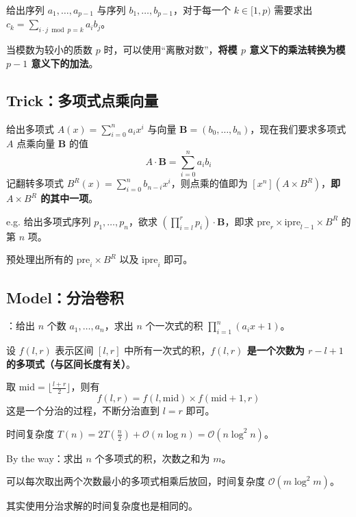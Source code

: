 给出序列 $a_1, \dots, a_{p - 1}$ 与序列 $b_1, \dots, b_{p - 1}$，对于每一个 $k \in [1, p)$ 需要求出 $c_k = \sum_{i\cdot j \bmod p = k} a_ib_j$。

当模数为较小的质数 $p$ 时，可以使用“离散对数”，\textbf{将模 $p$ 意义下的乘法转换为模 $p - 1$ 意义下的加法}。

\subsection{Trick：多项式点乘向量}

给出多项式 $A(x) = \sum_{i = 0}^n a_ix^i$ 与向量 $\mathbf{B} = (b_0, \dots, b_n)$，现在我们要求多项式 $A$ 点乘向量 $\mathbf{B}$ 的值
\[
A \cdot \mathbf{B} = \sum_{i = 0}^n a_ib_i
\]
记翻转多项式 $B^R(x) = \sum_{i = 0}^n b_{n - i}x^i$，则点乘的值即为 $[x^n](A \times B^R)$，\textbf{即 $A \times B^R$ 的其中一项}。

\begin{quoteblock}
e.g. 给出多项式序列 $p_1, \dots, p_n$，欲求 $\left(\prod_{i = l}^r p_i\right) \cdot \mathbf{B}$，即求 $\mathrm{pre}_r \times \mathrm{ipre}_{l - 1} \times B^R$ 的第 $n$ 项。

预处理出所有的 $\mathrm{pre}_i \times B^R$ 以及 $\mathrm{ipre}_i$ 即可。
\end{quoteblock}

\subsection{Model：分治卷积}

：给出 $n$ 个数 $a_1, \dots, a_n$，求出 $n$ 个一次式的积 $\prod_{i = 1}^n(a_ix + 1)$。

设 $f(l, r)$ 表示区间 $[l, r]$ 中所有一次式的积，\textbf{$f(l, r)$ 是一个次数为 $r - l + 1$ 的多项式（与区间长度有关）}。

取 $\mathrm{mid} = \lfloor \frac{l + r}{2} \rfloor$，则有
\[
f(l, r) = f(l, \mathrm{mid}) \times f(\mathrm{mid} + 1, r)
\]
这是一个分治的过程，不断分治直到 $l = r$ 即可。

时间复杂度 $T(n) = 2T\left( \frac{n}{2} \right) + \mathcal{O}(n \log n) = \mathcal{O}(n \log^2 n)$。

\begin{quoteblock}
By the way：求出 $n$ 个多项式的积，次数之和为 $m$。

可以每次取出两个次数最小的多项式相乘后放回，时间复杂度 $\mathcal{O}(m \log^2 m)$。

其实使用分治求解的时间复杂度也是相同的。
\end{quoteblock}

